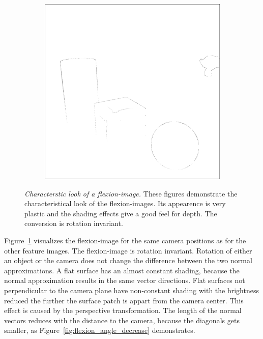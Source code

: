 \begin{figure}[H]
\begin{subfigure}[t]{0.32\textwidth}
    \end{subfigure}
    \begin{subfigure}[t]{0.32\textwidth}
        \includegraphics[width=\linewidth]{chapter04/img/flexion-0210.png}
    \end{subfigure}
    \caption[Characterstic look of a \gls{flexion-image}]{\emph{Characterstic look of a \gls{flexion-image}.} These figures demonstrate the characteristical look of the \Glspl{flexion-image}. Its appearence is very plastic and the shading effects give a good feel for depth. The conversion is rotation invariant.}\label{fig:flexion_images}
\end{figure}
Figure~\ref{fig:flexion_images} visualizes the \Gls{flexion-image} for the same camera positions as for the other feature images.
The \gls{flexion-image} is rotation invariant.
Rotation of either an object or the camera does not change the difference between the two normal approximations.
A flat surface has an almost constant shading, because the normal approximation results in the same vector directions.
Flat surfaces not perpendicular to the camera plane have non-constant shading with the brightness reduced the further the surface patch is appart from the camera center.
This effect is caused by the perspective transformation.
The length of the normal vectors reduces with the distance to the camera, because the diagonals gets smaller, as Figure~\ref{fig:flexion_angle_decrease} demonstrates.
